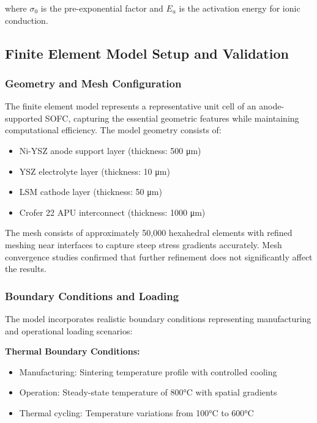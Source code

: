 \documentclass[conference]{IEEEtran}
\begin{document}
where $\sigma_0$ is the pre-exponential factor and $E_a$ is the activation energy for ionic conduction.

\subsection{Finite Element Model Setup and Validation}

\subsubsection{Geometry and Mesh Configuration}

The finite element model represents a representative unit cell of an anode-supported SOFC, capturing the essential geometric features while maintaining computational efficiency. The model geometry consists of:

\begin{itemize}
\item Ni-YSZ anode support layer (thickness: 500 μm)
\item YSZ electrolyte layer (thickness: 10 μm)
\item LSM cathode layer (thickness: 50 μm)
\item Crofer 22 APU interconnect (thickness: 1000 μm)
\end{itemize}

The mesh consists of approximately 50,000 hexahedral elements with refined meshing near interfaces to capture steep stress gradients accurately. Mesh convergence studies confirmed that further refinement does not significantly affect the results.

\subsubsection{Boundary Conditions and Loading}

The model incorporates realistic boundary conditions representing manufacturing and operational loading scenarios:

\textbf{Thermal Boundary Conditions:}
\begin{itemize}
\item Manufacturing: Sintering temperature profile with controlled cooling
\item Operation: Steady-state temperature of 800°C with spatial gradients
\item Thermal cycling: Temperature variations from 100°C to 600°C
\end{itemize}
\end{document}
